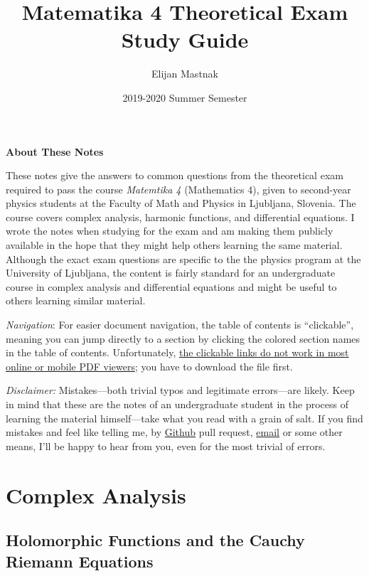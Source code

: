 \documentclass[11pt, a4paper]{article}
\begin{document}
\title{Matematika 4 Theoretical Exam Study Guide}
\author{Elijan Mastnak}
\date{2019-2020 Summer Semester}
\maketitle

\begin{center}
\textbf{About These Notes}
\end{center}
These notes give the answers to common questions from the theoretical exam required to pass the course \textit{Matemtika 4} (Mathematics 4), given to second-year physics students at the Faculty of Math and Physics in Ljubljana, Slovenia. The course covers complex analysis, harmonic functions, and differential equations. I wrote the notes when studying for the exam and am making them publicly available in the hope that they might help others learning the same material. Although the exact exam questions are specific to the the physics program at the University of Ljubljana, the content is fairly standard for an undergraduate course in complex analysis and differential equations and might be useful to others learning similar material.

\vspace{2mm}
\textit{Navigation}: For easier document navigation, the table of contents is ``clickable'', meaning you can jump directly to a section by clicking the colored section names in the table of contents. Unfortunately, \uline{the clickable links do not work in most online or mobile PDF viewers}; you have to download the file first.


\vspace{2mm}
\textit{Disclaimer:} Mistakes---both trivial typos and legitimate errors---are likely. Keep in mind that these are the notes of an undergraduate student in the process of learning the material himself---take what you read with a grain of salt. If you find mistakes and feel like telling me, by \href{https://github.com/ejmastnak/fmf}{Github} pull request, \href{mailto:ejmastnak@gmail.com}{email} or some other means, I'll be happy to hear from you, even for the most trivial of errors.

\tableofcontents

\newpage
\section{Complex Analysis}

\subsection{Holomorphic Functions and the Cauchy Riemann Equations}
\end{document}
